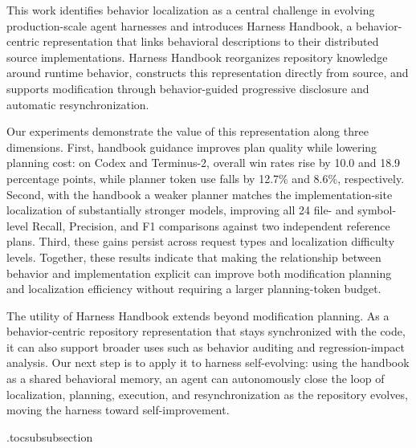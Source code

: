 \documentclass[]{ailab}
\begin{document}
This work identifies behavior localization as a central challenge in evolving
production-scale agent harnesses and introduces Harness Handbook, a
behavior-centric representation that links behavioral descriptions to their
distributed source implementations. Harness Handbook reorganizes repository
knowledge around runtime behavior, constructs this representation directly from
source, and supports modification through behavior-guided progressive
disclosure and automatic resynchronization.

Our experiments demonstrate the value of this representation along three
dimensions. First, handbook guidance improves plan quality while lowering
planning cost: on Codex and Terminus-2, overall win rates rise by 10.0 and 18.9
percentage points, while planner token use falls by 12.7\% and 8.6\%,
respectively. Second, with the handbook a weaker planner matches the
implementation-site localization of substantially stronger models, improving all
24 file- and symbol-level Recall, Precision, and F1 comparisons against two
independent reference plans. Third, these gains persist across request types and
localization difficulty levels. Together, these results indicate that making the
relationship between behavior and implementation explicit can improve both
modification planning and localization efficiency without requiring a larger
planning-token budget.

The utility of Harness Handbook extends beyond modification planning. As a
behavior-centric repository representation that stays synchronized with the code,
it can also support broader uses such as behavior auditing and regression-impact
analysis. Our next step is to apply it to harness self-evolving: using the
handbook as a shared behavioral memory, an agent can autonomously close the loop
of localization, planning, execution, and resynchronization as the repository
evolves, moving the harness toward self-improvement.

\clearpage
\nocite{*}
% 



\clearpage
\appendix

\etocsettocdepth.toc{subsubsection}
\begingroup
\hypersetup{linkcolor=black}
\renewcommand{\contentsname}{Appendix Contents}
\etocsettocstyle{\section*{\contentsname}\vspace{10pt}}{}
\linespread{1.5}\selectfont
\tableofcontents
\endgroup
\clearpage
\end{document}
